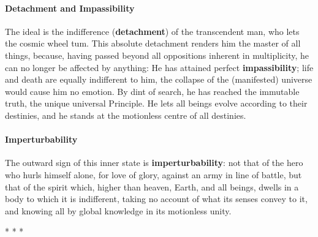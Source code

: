\paragraph{Detachment and Impassibility}
\begin{quotex}
The ideal is the indifference (\textbf{detachment}) of the transcendent man, who lets the cosmic wheel tum. This absolute detachment renders him the master of all things, because, having passed beyond all oppositions inherent in multiplicity, he can no longer be affected by anything: He has attained perfect \textbf{impassibility}; life and death are equally indifferent to him, the collapse of the (manifested) universe would cause him no emotion. By dint of search, he has reached the immutable truth, the unique universal Principle. He lets all beings evolve according to their destinies, and he stands at the motionless centre of all destinies.

\end{quotex}
\paragraph{Imperturbability}
\begin{quotex}
The outward sign of this inner state is \textbf{imperturbability}: not that of the hero who hurls himself alone, for love of glory, against an army in line of battle, but that of the spirit which, higher than heaven, Earth, and all beings, dwells in a body to which it is indifferent, taking no account of what its senses convey to it, and knowing all by global knowledge in its motionless unity.

\end{quotex}



\begin{center}* * *\end{center}

